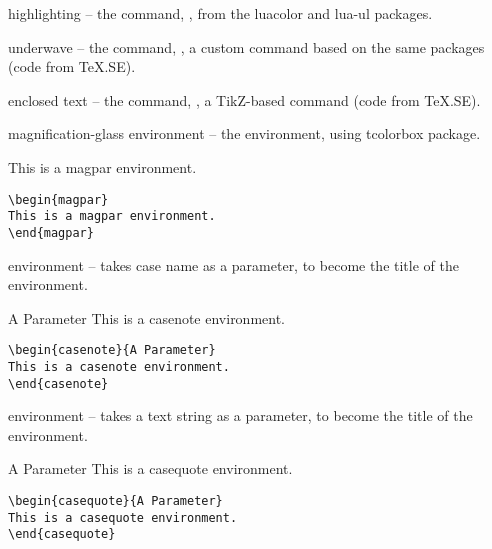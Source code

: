\p highlighting -- the  command, , from the luacolor and lua-ul packages.

\p underwave -- the  command, , a custom command based on the same packages (code from TeX.SE).

\p enclosed text -- the  command, , a TikZ-based command (code from TeX.SE).

\p magnification-glass environment -- the  environment, using tcolorbox package.
\begin{magpar}
This is a magpar environment.
\end{magpar}

\begin{verbatim}
\begin{magpar}
This is a magpar environment.
\end{magpar}
\end{verbatim}

\p {} environment -- takes case name as a parameter, to become the title of the environment.

\begin{casenote}{A Parameter}
This is a casenote environment.
\end{casenote}

\begin{verbatim}
\begin{casenote}{A Parameter}
This is a casenote environment.
\end{casenote}
\end{verbatim}

\p {} environment -- takes a text string as a parameter, to become the title of the environment.

\begin{casequote}{A Parameter}
This is a casequote environment.
\end{casequote}

\begin{verbatim}
\begin{casequote}{A Parameter}
This is a casequote environment.
\end{casequote}
\end{verbatim}






